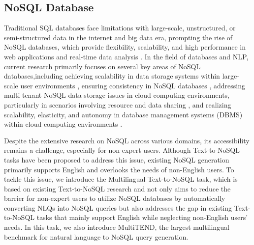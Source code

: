 \subsection{NoSQL Database}


Traditional SQL databases face limitations with large-scale, unstructured, or semi-structured data in the internet and big data era, prompting the rise of NoSQL databases, which provide flexibility, scalability, and high performance in web applications and real-time data analysis \cite{moniruzzaman2013nosql}.
%
In the field of databases and NLP, current research primarily focuses on several key areas of NoSQL databases,including achieving scalability in data storage systems within large-scale user environments \citep{cattell2011scalable}, ensuring consistency in NoSQL databases \citep{diogo2019consistency}, addressing multi-tenant NoSQL data storage issues in cloud computing environments, particularly in scenarios involving resource and data sharing \citep{zeng2015resource}, and realizing scalability, elasticity, and autonomy in database management systems (DBMS) within cloud computing environments \citep{agrawal2011database}.

Despite the extensive research on NoSQL across various domains, its accessibility remains a challenge, especially for non-expert users. Although Text-to-NoSQL tasks have been proposed to address this issue, existing NoSQL generation primarily supports English and overlooks the needs of non-English users.
To tackle this issue, we introduce the Multilingual Text-to-NoSQL task, which is based on existing Text-to-NoSQL research and not only aims to reduce the barrier for non-expert users to utilize NoSQL databases by automatically converting NLQs into NoSQL queries but also addresses the gap in existing Text-to-NoSQL tasks that mainly support English while neglecting non-English users' needs. In this task, we also introduce MultiTEND, the largest multilingual benchmark for natural language to NoSQL query generation.

\newpage